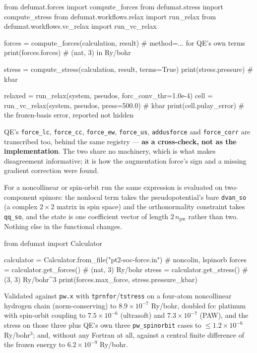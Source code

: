 \documentclass[11pt,a4paper]{article}
\newcommand{\code}[1]{\texttt{\small #1}}
\begin{document}
\begin{pycode}
from defumat.forces import compute_forces
from defumat.stress import compute_stress
from defumat.workflows.relax import run_relax
from defumat.workflows.vc_relax import run_vc_relax

forces = compute_forces(calculation, result)      # method=... for QE's own terms
print(forces.forces)                              # (nat, 3) in Ry/bohr

stress = compute_stress(calculation, result, terms=True)
print(stress.pressure)                            # kbar

relaxed = run_relax(system, pseudos, forc_conv_thr=1.0e-4)
cell = run_vc_relax(system, pseudos, press=500.0) # kbar
print(cell.pulay_error)   # the frozen-basis error, reported not hidden
\end{pycode}

QE's \code{force\_lc}, \code{force\_cc}, \code{force\_ew}, \code{force\_us},
\code{addusforce} and \code{force\_corr} are transcribed too, behind the same
registry --- \textbf{as a cross-check, not as the implementation}. The two share
no machinery, which is what makes disagreement informative; it is how the
augmentation force's sign and a missing gradient correction were found.

For a noncollinear or spin-orbit run the same expression is evaluated on
two-component spinors: the nonlocal term takes the pseudopotential's bare
\code{dvan\_so} (a complex $2\times2$ matrix in spin space) and the
orthonormality constraint takes \code{qq\_so}, and the state is one coefficient
vector of length $2\,n_{\mathrm{pw}}$ rather than two. Nothing else in the
functional changes.

\begin{pycode}
from defumat import Calculator

calculator = Calculator.from_file("pt2-soc-force.in")   # noncolin, lspinorb
forces = calculator.get_forces()          # (nat, 3) Ry/bohr
stress = calculator.get_stress()          # (3, 3)   Ry/bohr^3
print(forces.max_force, stress.pressure_kbar)
\end{pycode}

Validated against \code{pw.x} with \code{tprnfor}/\code{tstress} on a four-atom
noncollinear hydrogen chain (norm-conserving) to $8.9\times10^{-7}$ Ry/bohr,
doubled fcc platinum with spin-orbit coupling to $7.5\times10^{-6}$ (ultrasoft)
and $7.3\times10^{-7}$ (PAW), and the stress on those three plus QE's own three
\code{pw\_spinorbit} cases to $\le 1.2\times10^{-6}$ Ry/bohr$^3$; and, without
any Fortran at all, against a central finite difference of the frozen energy to
$6.2\times10^{-9}$ Ry/bohr.
\end{document}
